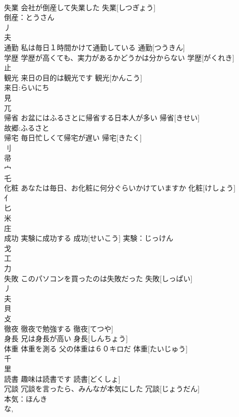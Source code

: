 \documentclass[8pt]{extreport}
\begin{document}
\begin{CJK}{UTF8}{min}
\\	失業	会社が倒産して失業した	失業[しつぎょう]			
\\	倒産：とうさん
\\	丿 
\\	夫 
\\	通勤	私は毎日１時間かけて通勤している	通勤[つうきん]			
\\	学歴	学歴が高くても、実力があるかどうかは分からない	学歴[がくれき]			
\\	止 
\\	観光	来日の目的は観光です	観光[かんこう]			
\\	来日:らいにち
\\	見 
\\	兀 
\\	帰省	お盆にはふるさとに帰省する日本人が多い	帰省[きせい]			
\\	故郷:ふるさと
\\	帰宅	毎日忙しくて帰宅が遅い	帰宅[きたく]			
\\	刂 
\\	帚 
\\	宀 
\\	乇	
\\	化粧	あなたは毎日、お化粧に何分ぐらいかけていますか	化粧[けしょう]			
\\	亻 
\\	匕 
\\	米 
\\	庄 
\\	成功	実験に成功する	成功[せいこう]			実験：じっけん
\\	戈 
\\	工 
\\	力 
\\	失敗	このパソコンを買ったのは失敗だった	失敗[しっぱい]			
\\	丿 
\\	夫 
\\	貝 
\\	攴 
\\	徹夜	徹夜で勉強する	徹夜[てつや]			
\\	身長	兄は身長が高い	身長[しんちょう]			
\\	体重	体重を測る 父の体重は６０キロだ	体重[たいじゅう]			
\\	千 
\\	里 
\\	読書	趣味は読書です	読書[どくしょ]			
\\	冗談	冗談を言ったら、みんなが本気にした	冗談[じょうだん]			
\\	本気：ほんき
\\	な, 

\end{CJK}
\end{document}
